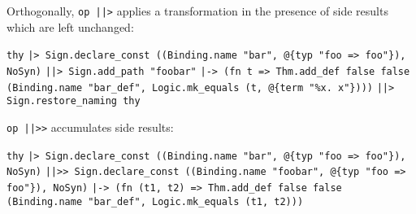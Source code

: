 \begin{isabellebody}
\begin{isamarkuptext}
\begin{mldecls}
  \end{mldecls}

  \noindent Orthogonally, \verb|op |\verb,|,\verb||\verb,|,\verb|>| applies a transformation
  in the presence of side results which are left unchanged:

  \smallskip\begin{mldecls}
\verb|thy|\isasep\isanewline%
\verb||\verb,|,\verb|> Sign.declare_const ((Binding.name "bar", @{typ "foo => foo"}), NoSyn)|\isasep\isanewline%
\verb||\verb,|,\verb||\verb,|,\verb|> Sign.add_path "foobar"|\isasep\isanewline%
\verb||\verb,|,\verb|-> (fn t => Thm.add_def false false|\isasep\isanewline%
\verb|      (Binding.name "bar_def", Logic.mk_equals (t, @{term "%x. x"})))|\isasep\isanewline%
\verb||\verb,|,\verb||\verb,|,\verb|> Sign.restore_naming thy|\isasep\isanewline%

  \end{mldecls}

  \noindent \verb|op |\verb,|,\verb||\verb,|,\verb|>>| accumulates side results:

  \smallskip\begin{mldecls}
\verb|thy|\isasep\isanewline%
\verb||\verb,|,\verb|> Sign.declare_const ((Binding.name "bar", @{typ "foo => foo"}), NoSyn)|\isasep\isanewline%
\verb||\verb,|,\verb||\verb,|,\verb|>> Sign.declare_const ((Binding.name "foobar", @{typ "foo => foo"}), NoSyn)|\isasep\isanewline%
\verb||\verb,|,\verb|-> (fn (t1, t2) => Thm.add_def false false|\isasep\isanewline%
\verb|      (Binding.name "bar_def", Logic.mk_equals (t1, t2)))|\isasep\isanewline%


\end{mldecls}
\end{isamarkuptext}
\end{isabellebody}
